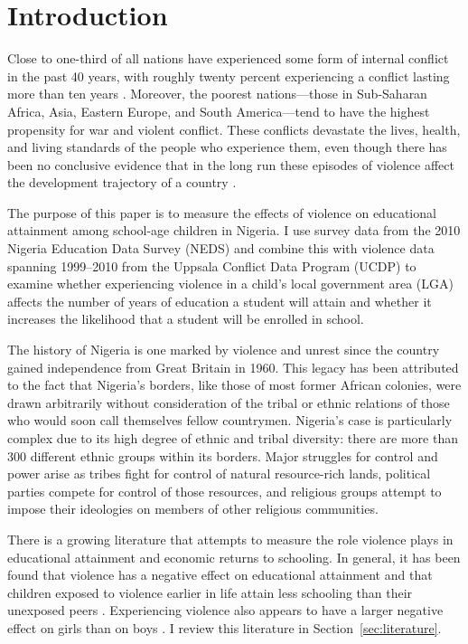 
\section{Introduction}
\label{sec:introduction}

Close to one-third of all nations have experienced some form of internal
conflict in the past 40 years, with roughly twenty percent experiencing a
conflict lasting more than ten years \citep{blattman2009civil}. Moreover,
the poorest nations---those in Sub-Saharan Africa, Asia, Eastern Europe,
and South America---tend to have the highest propensity for war and violent
conflict. These conflicts devastate the lives, health, and living standards
of the people who experience them, even though there has been no conclusive
evidence that in the long run these episodes of violence affect the
development trajectory of a country \citep{davis2002bones,
miguel2011long}.

The purpose of this paper is to measure the effects of violence on
educational attainment among school-age children in Nigeria. I use survey
data from the 2010 Nigeria Education Data Survey (NEDS) and combine this
with violence data spanning 1999--2010 from the Uppsala Conflict Data
Program (UCDP) to examine whether experiencing violence in a child's local
government area (LGA) affects the number of years of education a student
will attain and whether it increases the likelihood that a student will be
enrolled in school.

The history of Nigeria is one marked by violence and unrest since the
country gained independence from Great Britain in 1960. This legacy has
been attributed to the fact that Nigeria's borders, like those of most
former African colonies, were drawn arbitrarily without consideration of the
tribal or ethnic relations of those who would soon call themselves fellow
countrymen. Nigeria's case is particularly complex due to its high degree of
ethnic and tribal diversity: there are more than 300 different ethnic groups
within its borders. Major struggles for control and power arise as tribes
fight for control of natural resource-rich lands, political parties compete
for control of those resources, and religious groups attempt to impose their
ideologies on members of other religious communities.

There is a growing literature that attempts to measure the role violence
plays in educational attainment and economic returns to schooling. In
general, it has been found that violence has a negative effect on
educational attainment and that children exposed to violence earlier in life
attain less schooling than their unexposed peers \citep{leon2012, shemyakina2011}. 
Experiencing violence also appears to have a larger negative effect on girls
than on boys \citep{shemyakina2011}. I review this literature in
Section~\ref{sec:literature}.

